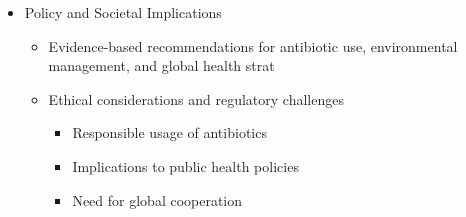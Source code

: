 \documentclass[11pt]{report}
\begin{document}
{\begin{itemize}
\begin{itemize}
	\end{itemize}
	\item Policy and Societal Implications
	\begin{itemize}
		\item Evidence-based recommendations for antibiotic use, environmental management, and global health strat
		\item Ethical considerations and regulatory challenges
		\begin{itemize}
			\item Responsible usage of antibiotics
			\item Implications to public health policies
			\item Need for global cooperation 
		\end{itemize}
	\end{itemize}
\end{itemize}
}
\end{document}
